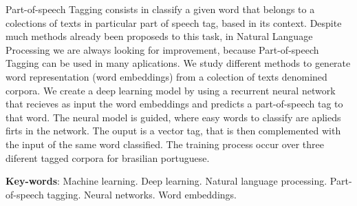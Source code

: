 \begin{resumo}[Abstract]
 
Part-of-speech Tagging consists in classify a given word that belongs to a colections of texts in particular part of speech tag, based in its context. Despite much methods already been proposeds to this task, in Natural Language Processing we are always looking for improvement, because Part-of-speech Tagging can be used in many aplications. We study different methods to generate word representation (word embeddings) from a colection of texts denomined corpora. We create a deep learning model by using a recurrent neural network that recieves as input the word embeddings and predicts a part-of-speech tag to that word. The neural model is guided, where easy words to classify are aplieds firts in the network. The ouput is a vector tag, that is then complemented with the input of the same word classified. The training process occur over three diferent tagged corpora for brasilian portuguese.

 \vspace{\onelineskip}
 
 \noindent 
 \textbf{Key-words}: Machine learning. Deep learning. Natural language processing. Part-of-speech tagging. Neural networks. Word embeddings.
\end{resumo}
